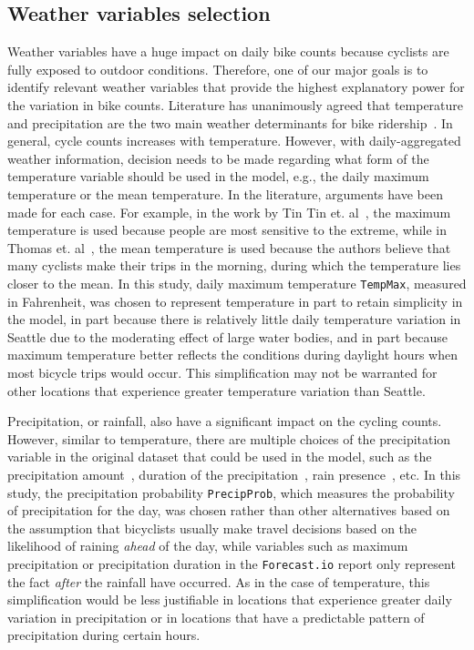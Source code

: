 \documentclass [11pt, proquest] {uwthesis}[2015/03/03]
\begin{document}
\subsection{Weather variables selection}
Weather variables have a huge impact on daily bike counts because cyclists are fully exposed to outdoor conditions. Therefore, one of our major goals is to identify relevant weather variables that provide the highest explanatory power for the variation in bike counts. Literature has unanimously agreed that temperature and precipitation are the two main weather determinants for bike ridership~\cite{Nosal:2014aa,Tin:2012aa}. In general, cycle counts increases with temperature. However, with daily-aggregated weather information, decision needs to be made regarding what form of the temperature variable should be used in the model, e.g., the daily maximum temperature or the mean temperature. In the literature, arguments have been made for each case. For example, in the work by Tin Tin et. al~\cite{Tin:2012aa}, the maximum temperature is used because people are most sensitive to the extreme, while in Thomas et. al~\cite{Thomas09}, the mean temperature is used because the authors believe that many cyclists make their trips in the morning, during which the temperature lies closer to the mean. In this study, daily maximum temperature \texttt{TempMax}, measured in Fahrenheit, was chosen to represent temperature in part to retain simplicity in the model, in part because there is relatively little daily temperature variation in Seattle due to the moderating effect of large water bodies, and in part because maximum temperature better reflects the conditions during daylight hours when most bicycle trips would occur. This simplification may not be warranted for other locations that experience greater temperature variation than Seattle. 

Precipitation, or rainfall, also have a significant impact on the cycling counts. However, similar to temperature, there are multiple choices of the precipitation variable in the original dataset that could be used in the model, such as the precipitation amount~\cite{Ahmed12}, duration of the precipitation~\cite{Thomas09}, rain presence~\cite{Miranda-Moreno:2011aa}, etc. In this study, the precipitation probability \texttt{PrecipProb}, which measures the probability of precipitation for the day, was chosen rather than other alternatives based on the assumption that bicyclists usually make travel decisions based on the likelihood of raining \emph{ahead} of the day, while variables such as maximum precipitation or precipitation duration in the \texttt{Forecast.io} report only represent the fact \emph{after} the rainfall have occurred. As in the case of temperature, this simplification would be less justifiable in locations that experience greater daily variation in precipitation or in locations that have a predictable pattern of precipitation during certain hours.
\end{document}
